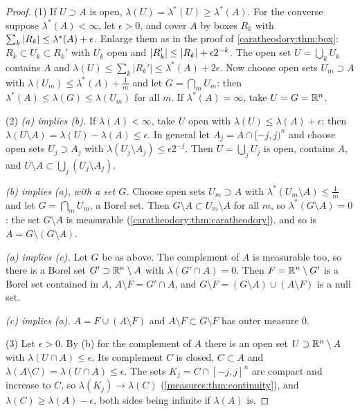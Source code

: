 \begin{notechapter}
\begin{proof}
(1) If $U\supset A$ is open, $\lambda(U) = \lambda^*(U)\geq\lambda^*(A)$.
For the converse suppose $\lambda^*(A) < \infty$, let $\epsilon > 0$,
and cover $A$ by boxes $R_k$ with
$\sum_k\left|R_k\right|\leq\lambda^*(A) + \epsilon$. Enlarge them as in the
proof of \cref{caratheodory:thm:box}: $R_k\subset U_k\subset R_k'$
with $U_k$ open and $\lvert R_k'\rvert\leq\left|R_k\right| + \epsilon2^{-k}$. The
open set $U = \bigcup_kU_k$ contains $A$ and
$\lambda(U)\leq\sum_k\lvert R_k'\rvert\leq\lambda^*(A) + 2\epsilon$. Now
choose open sets $U_m\supset A$ with
$\lambda(U_m)\leq\lambda^*(A) + \frac1m$ and let $G = \bigcap_mU_m$:
then $\lambda^*(A)\leq\lambda(G)\leq\lambda(U_m)$ for all $m$. If
$\lambda^*(A) = \infty$, take $U = G = \mathbb{R}^n$.

(2) \emph{(a) implies (b).} If $\lambda(A) < \infty$, take $U$ open
with $\lambda(U)\leq\lambda(A) + \epsilon$; then
$\lambda(U\setminus A) = \lambda(U) - \lambda(A)\leq\epsilon$. In
general let $A_j = A\cap[-j, j)^n$ and choose open sets
$U_j\supset A_j$ with $\lambda(U_j\setminus A_j)\leq\epsilon2^{-j}$.
Then $U = \bigcup_jU_j$ is open, contains $A$, and
$U\setminus A\subset\bigcup_j(U_j\setminus A_j)$.

\emph{(b) implies (a), with a set $G$.} Choose open sets
$U_m\supset A$ with $\lambda^*(U_m\setminus A)\leq\frac1m$ and let
$G = \bigcap_mU_m$, a Borel set. Then
$G\setminus A\subset U_m\setminus A$ for all $m$, so
$\lambda^*(G\setminus A) = 0$: the set $G\setminus A$ is measurable
(\cref{caratheodory:thm:caratheodory}), and so is
$A = G\setminus(G\setminus A)$.

\emph{(a) implies (c).} Let $G$ be as above. The complement of $A$ is
measurable too, so there is a Borel set $G'\supset\mathbb{R}^n\setminus A$
with $\lambda(G'\cap A) = 0$. Then $F = \mathbb{R}^n\setminus G'$ is a Borel
set contained in $A$, $A\setminus F = G'\cap A$, and
$G\setminus F = (G\setminus A)\cup(A\setminus F)$ is a null set.

\emph{(c) implies (a).} $A = F\cup(A\setminus F)$ and
$A\setminus F\subset G\setminus F$ has outer measure $0$.

(3) Let $\epsilon > 0$. By (b) for the complement of $A$ there is an
open set $U\supset\mathbb{R}^n\setminus A$ with $\lambda(U\cap A)\leq\epsilon$.
Its complement $C$ is closed, $C\subset A$ and
$\lambda(A\setminus C) = \lambda(U\cap A)\leq\epsilon$. The sets
$K_j = C\cap[-j, j]^n$ are compact and increase to $C$, so
$\lambda(K_j)\to\lambda(C)$ (\cref{measures:thm:continuity}), and
$\lambda(C)\geq\lambda(A) - \epsilon$, both sides being infinite if
$\lambda(A)$ is.
\end{proof}


\end{notechapter}
